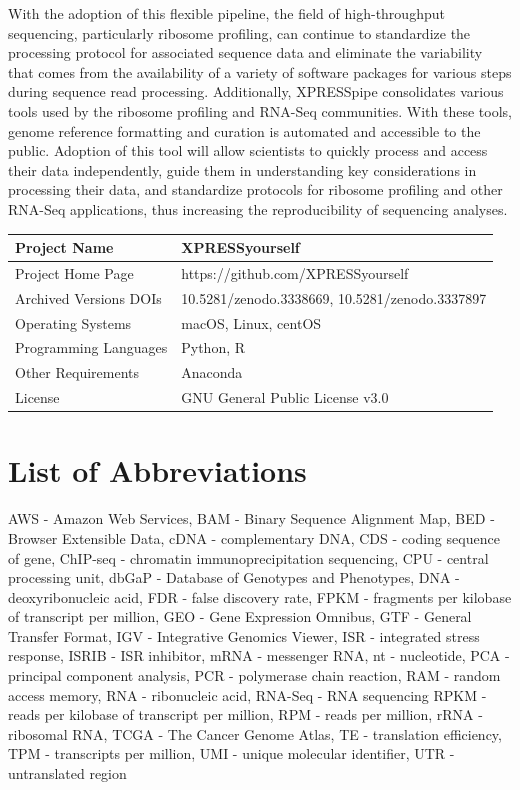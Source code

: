 \documentclass[10pt, oneside]{article}
\begin{document}
With the adoption of this flexible pipeline, the field of high-throughput sequencing, particularly ribosome profiling, can continue to standardize the processing protocol for associated sequence data and eliminate the variability that comes from the availability of a variety of software packages for various steps during sequence read processing. Additionally, XPRESSpipe consolidates various tools used by the ribosome profiling and RNA-Seq communities. With these tools, genome reference formatting and curation is automated and accessible to the public. Adoption of this tool will allow scientists to quickly process and access their data independently, guide them in understanding key considerations in processing their data, and standardize protocols for ribosome profiling and other RNA-Seq applications, thus increasing the reproducibility of sequencing analyses. \\

\begin{table}[!]
    \centering
{}
\begin{tabular}{p{4cm}p{9cm}}
 Project Name & XPRESSyourself \\
 \hline
 Project Home Page & https://github.com/XPRESSyourself \\
 \hline
 Archived Versions DOIs & 10.5281/zenodo.3338669, 10.5281/zenodo.3337897 \\
 \hline
 Operating Systems & macOS, Linux, centOS \\
 \hline
 Programming Languages & Python, R \\
 \hline
 Other Requirements & Anaconda \\
 \hline
 License & GNU General Public License v3.0 \\
\end{tabular}
\end{table}

\section*{List of Abbreviations}
AWS - Amazon Web Services,
BAM - Binary Sequence Alignment Map,
BED - Browser Extensible Data,
cDNA - complementary DNA,
CDS - coding sequence of gene,
ChIP-seq - chromatin immunoprecipitation sequencing,
CPU - central processing unit,
dbGaP - Database of Genotypes and Phenotypes,
DNA - deoxyribonucleic acid,
FDR - false discovery rate,
FPKM - fragments per kilobase of transcript per million,
GEO - Gene Expression Omnibus,
GTF - General Transfer Format,
IGV - Integrative Genomics Viewer,
ISR - integrated stress response,
ISRIB - ISR inhibitor,
mRNA - messenger RNA,
nt - nucleotide,
PCA - principal component analysis,
PCR - polymerase chain reaction,
RAM - random access memory,
RNA - ribonucleic acid,
RNA-Seq - RNA sequencing
RPKM - reads per kilobase of transcript per million,
RPM - reads per million,
rRNA - ribosomal RNA,
TCGA - The Cancer Genome Atlas,
TE - translation efficiency,
TPM - transcripts per million,
UMI - unique molecular identifier,
UTR - untranslated region\\
\end{document}
